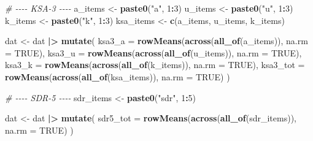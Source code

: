 \documentclass[
  10pt,
]{article}
\newenvironment{Shaded}{\begin{snugshade}}{\end{snugshade}}
\newcommand{\AttributeTok}[1]{\textcolor[rgb]{0.13,0.29,0.53}{#1}}
\newcommand{\CommentTok}[1]{\textcolor[rgb]{0.56,0.35,0.01}{\textit{#1}}}
\newcommand{\ConstantTok}[1]{\textcolor[rgb]{0.56,0.35,0.01}{#1}}
\newcommand{\DecValTok}[1]{\textcolor[rgb]{0.00,0.00,0.81}{#1}}
\newcommand{\FunctionTok}[1]{\textcolor[rgb]{0.13,0.29,0.53}{\textbf{#1}}}
\newcommand{\NormalTok}[1]{#1}
\newcommand{\OtherTok}[1]{\textcolor[rgb]{0.56,0.35,0.01}{#1}}
\newcommand{\SpecialCharTok}[1]{\textcolor[rgb]{0.81,0.36,0.00}{\textbf{#1}}}
\newcommand{\StringTok}[1]{\textcolor[rgb]{0.31,0.60,0.02}{#1}}
\begin{document}
\begin{Shaded}
\begin{Highlighting}[]
\CommentTok{\# {-}{-}{-}{-} KSA{-}3 {-}{-}{-}{-}}
\NormalTok{a\_items   }\OtherTok{\textless{}{-}} \FunctionTok{paste0}\NormalTok{(}\StringTok{"a"}\NormalTok{, }\DecValTok{1}\SpecialCharTok{:}\DecValTok{3}\NormalTok{)}
\NormalTok{u\_items   }\OtherTok{\textless{}{-}} \FunctionTok{paste0}\NormalTok{(}\StringTok{"u"}\NormalTok{, }\DecValTok{1}\SpecialCharTok{:}\DecValTok{3}\NormalTok{)}
\NormalTok{k\_items   }\OtherTok{\textless{}{-}} \FunctionTok{paste0}\NormalTok{(}\StringTok{"k"}\NormalTok{, }\DecValTok{1}\SpecialCharTok{:}\DecValTok{3}\NormalTok{)}
\NormalTok{ksa\_items }\OtherTok{\textless{}{-}} \FunctionTok{c}\NormalTok{(a\_items, u\_items, k\_items)}

\NormalTok{dat }\OtherTok{\textless{}{-}}\NormalTok{ dat }\SpecialCharTok{|\textgreater{}}
  \FunctionTok{mutate}\NormalTok{(}
    \AttributeTok{ksa3\_a   =} \FunctionTok{rowMeans}\NormalTok{(}\FunctionTok{across}\NormalTok{(}\FunctionTok{all\_of}\NormalTok{(a\_items)),   }\AttributeTok{na.rm =} \ConstantTok{TRUE}\NormalTok{),}
    \AttributeTok{ksa3\_u   =} \FunctionTok{rowMeans}\NormalTok{(}\FunctionTok{across}\NormalTok{(}\FunctionTok{all\_of}\NormalTok{(u\_items)),   }\AttributeTok{na.rm =} \ConstantTok{TRUE}\NormalTok{),}
    \AttributeTok{ksa3\_k   =} \FunctionTok{rowMeans}\NormalTok{(}\FunctionTok{across}\NormalTok{(}\FunctionTok{all\_of}\NormalTok{(k\_items)),   }\AttributeTok{na.rm =} \ConstantTok{TRUE}\NormalTok{),}
    \AttributeTok{ksa3\_tot =} \FunctionTok{rowMeans}\NormalTok{(}\FunctionTok{across}\NormalTok{(}\FunctionTok{all\_of}\NormalTok{(ksa\_items)), }\AttributeTok{na.rm =} \ConstantTok{TRUE}\NormalTok{)}
\NormalTok{  )}

\CommentTok{\# {-}{-}{-}{-} SDR{-}5 {-}{-}{-}{-}}
\NormalTok{sdr\_items }\OtherTok{\textless{}{-}} \FunctionTok{paste0}\NormalTok{(}\StringTok{"sdr"}\NormalTok{, }\DecValTok{1}\SpecialCharTok{:}\DecValTok{5}\NormalTok{)}

\NormalTok{dat }\OtherTok{\textless{}{-}}\NormalTok{ dat }\SpecialCharTok{|\textgreater{}}
  \FunctionTok{mutate}\NormalTok{(}
    \AttributeTok{sdr5\_tot =} \FunctionTok{rowMeans}\NormalTok{(}\FunctionTok{across}\NormalTok{(}\FunctionTok{all\_of}\NormalTok{(sdr\_items)), }\AttributeTok{na.rm =} \ConstantTok{TRUE}\NormalTok{)}
\NormalTok{  )}
\end{Highlighting}
\end{Shaded}
\end{document}

